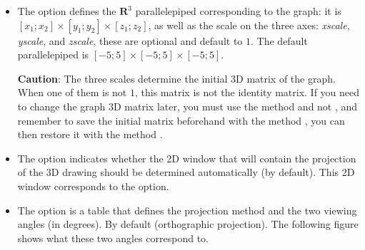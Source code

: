 \begin{itemize}
    \item The option  defines the $\mathbf R^3$ parallelepiped corresponding to the graph: it is $[x_1;x_2]\times[y_1;y_2]\times[z_1;z_2]$, as well as the scale on the three axes: \emph{xscale}, \emph{yscale}, and \emph{zscale}, these are optional and default to $1$. The default parallelepiped is $[-5;5]\times[-5;5]\times[-5;5]$.

    \textbf{Caution}: The three scales determine the initial 3D matrix of the graph. When one of them is not $1$, this matrix is ​​not the identity matrix. If you need to change the graph 3D matrix later, you must use the method  and not , and remember to save the initial matrix beforehand with the method , you can then restore it with the method .

    \item The option  indicates whether the 2D window that will contain the projection of the 3D drawing should be determined automatically (\false by default). This 2D window corresponds to the  option.

    \item The option  is a table that defines the projection method and the two viewing angles (in degrees). By default   (orthographic projection). The following figure shows what these two angles correspond to.


\end{itemize}
